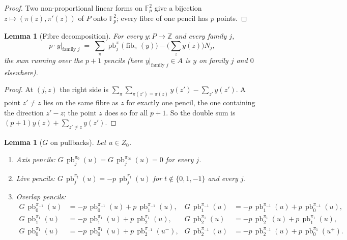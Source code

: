 \documentclass[11pt]{article}
\newtheorem{lemma}[theorem]{Lemma}
\theoremstyle{definition}
\theoremstyle{remark}
\newcommand{\Z}{\mathbb{Z}}
\newcommand{\F}{\mathbb{F}}
\newcommand{\pb}{\operatorname{pb}}
\newcommand{\fib}{\operatorname{fib}}
\begin{document}
\begin{proof}
Two non-proportional linear forms on $\F_p^2$ give a bijection $z\mapsto(\pi(z),\pi'(z))$ of $P$ onto $\F_p^2$; every fibre of one pencil has $p$ points.
\end{proof}

\begin{lemma}[Fibre decomposition]\label{lem:R1}
For every $y:P\to\Z$ and every family $j$,
\[
p\cdot y\big|_{\text{family }j} \;=\;\sum_{\pi}\pb_j^\pi\big(\fib_\pi(y)\big)-\Big(\sum_{z}y(z)\Big)N_j ,
\]
the sum running over the $p+1$ pencils (here $y|_{\text{family }j}\in A$ is $y$ on family $j$ and $0$ elsewhere).
\end{lemma}

\begin{proof}
At $(j,z)$ the right side is $\sum_\pi\sum_{\pi(z')=\pi(z)}y(z')-\sum_{z'}y(z')$. A point $z'\neq z$ lies on the same fibre as $z$ for exactly one pencil, the one containing the direction $z'-z$; the point $z$ does so for all $p+1$. So the double sum is $(p+1)y(z)+\sum_{z'\ne z}y(z')$.
\end{proof}

\begin{lemma}[$G$ on pullbacks]\label{lem:G}
Let $u\in Z_0$.
\begin{enumerate}[label=(\alph*)]
\item Axis pencils: $G\,\pb_j^{\pi_0}(u)=G\,\pb_j^{\pi_\infty}(u)=0$ for every $j$.
\item Live pencils: $G\,\pb_j^{\pi_t}(u)=-p\,\pb_j^{\pi_t}(u)$ for $t\notin\{0,1,-1\}$ and every $j$.
\item Overlap pencils:
\begin{align*}
G\,\pb_0^{\pi_{-1}}(u)&=-p\,\pb_0^{\pi_{-1}}(u)+p\,\pb_1^{\pi_{-1}}(u), & G\,\pb_1^{\pi_{-1}}(u)&=-p\,\pb_1^{\pi_{-1}}(u)+p\,\pb_0^{\pi_{-1}}(u),\\
G\,\pb_1^{\pi_{1}}(u)&=-p\,\pb_1^{\pi_{1}}(u)+p\,\pb_2^{\pi_{1}}(u), & G\,\pb_2^{\pi_{1}}(u)&=-p\,\pb_2^{\pi_{1}}(u)+p\,\pb_1^{\pi_{1}}(u),\\
G\,\pb_0^{\pi_{1}}(u)&=-p\,\pb_0^{\pi_{1}}(u)+p\,\pb_2^{\pi_{-1}}(u^-), & G\,\pb_2^{\pi_{-1}}(u)&=-p\,\pb_2^{\pi_{-1}}(u)+p\,\pb_0^{\pi_{1}}(u^+).
\end{align*}
\end{enumerate}
\end{lemma}
\end{document}
